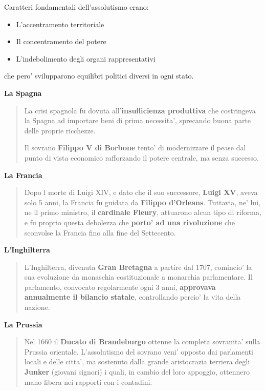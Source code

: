 \documentclass{article}
\begin{document}
{{    Caratteri fondamentali dell'assolutismo erano:

    \begin{itemize}
      \item L'accentramento territoriale
      \item Il concentramento del potere
      \item L'indebolimento degli organi rappresentativi
    \end{itemize}

    che pero' svilupparono equilibri politici diversi in ogni stato.

    \textbf{La Spagna}
    \begin{quote}
      La crisi spagnola fu dovuta all'\textbf{insufficienza produttiva} che costringeva la Spagna ad importare beni di prima necessita', sprecando buona parte delle proprie ricchezze.

      Il sovrano \textbf{Filippo V di Borbone} tento' di modernizzare il pease dal punto di vista economico rafforzando il potere centrale, ma senza successo.
    \end{quote}

    \textbf{La Francia}
    \begin{quote}
      Dopo l morte di Luigi XIV, e dato che il suo successore, \textbf{Luigi XV}, aveva solo 5 anni, la Francia fu guidata da \textbf{Filippo d'Orleans}. Tuttavia, ne' lui, ne il primo ministro, il \textbf{cardinale Fleury}, attuarono alcun tipo di riforma, e fu proprio questa debolezza che \textbf{porto' ad una rivoluzione} che sconvolse la Francia fino alla fine del Settecento.
    \end{quote}

    \textbf{L'Inghilterra}
    \begin{quote}
      L'Inghilterra, divenuta \textbf{Gran Bretagna} a partire dal 1707, comincio' la sua evoluzione da monaschia costituzionale a monarchia parlamentare. Il parlamento, convocato regolarmente ogni 3 anni, \textbf{approvava annualmente il bilancio statale}, controllando percio' la vita della nazione.
    \end{quote}

    \textbf{La Prussia}
    \begin{quote}
      Nel 1660 il \textbf{Ducato di Brandeburgo} ottenne la completa sovranita' sulla Prussia orientale. L'assolutismo del sovrano veni' opposto dai parlamenti locali e delle citta', ma sostenuto dalla grande aristocrazia terriera degli \textbf{Junker} \small{(giovani signori)} i quali, in cambio del loro appoggio, ottennero mano libera nei rapporti con i contadini.
    \end{quote}

}}
\end{document}
